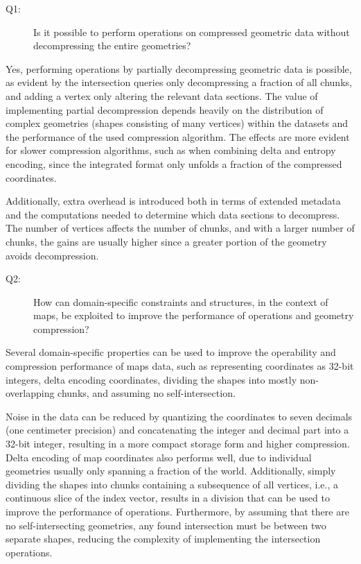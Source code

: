 \begin{description}
    \item[Q1:] Is it possible to perform operations on compressed geometric data without decompressing the entire geometries?
\end{description}

\noindent Yes, performing operations by partially decompressing geometric data is possible, as evident by the intersection queries only decompressing a fraction of all chunks, and adding a vertex only altering the relevant data sections.
The value of implementing partial decompression depends heavily on the distribution of complex geometries (shapes consisting of many vertices) within the datasets and the performance of the used compression algorithm. The effects are more evident for slower compression algorithms, such as when combining delta and entropy encoding, since the integrated format only unfolds a fraction of the compressed coordinates. 

Additionally, extra overhead is introduced both in terms of extended metadata and the computations needed to determine which data sections to decompress. The number of vertices affects the number of chunks, and with a larger number of chunks, the gains are usually higher since a greater portion of the geometry avoids decompression.

\begin{description}
    \item[Q2:] How can domain-specific constraints and structures, in the context of maps, be exploited to improve the performance of operations and geometry compression?
\end{description}

\noindent Several domain-specific properties can be used to improve the operability and compression performance of maps data, such as representing coordinates as 32-bit integers, delta encoding coordinates, dividing the shapes into mostly non-overlapping chunks, and assuming no self-intersection.

Noise in the data can be reduced by quantizing the coordinates to seven decimals (one centimeter precision) and concatenating the integer and decimal part into a 32-bit integer, resulting in a more compact storage form and higher compression. Delta encoding of map coordinates also performs well, due to individual geometries usually only spanning a fraction of the world. Additionally, simply dividing the shapes into chunks containing a subsequence of all vertices, i.e., a continuous slice of the index vector, results in a division that can be used to improve the performance of operations. Furthermore, by assuming that there are no self-intersecting geometries, any found intersection must be between two separate shapes, reducing the complexity of implementing the intersection operations.  

